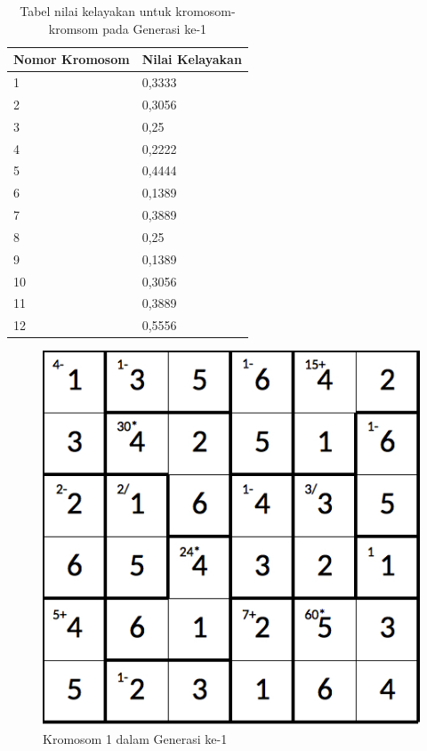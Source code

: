 \begin{table}
\centering
\captionsetup{justification=centering}
\caption[Tabel nilai kelayakan untuk kromosom-kromsom pada Generasi ke-1]{Tabel nilai kelayakan untuk kromosom-kromsom pada Generasi ke-1}
\begin{tabular}{| l | l |}
\hline
Nomor Kromosom & Nilai Kelayakan \\
\hline \hline
1 & 0,3333 \\
\hline
2 & 0,3056 \\
\hline
3 & 0,25 \\
\hline
4 & 0,2222 \\
\hline
5 & 0,4444 \\
\hline
6 & 0,1389 \\
\hline
7 & 0,3889 \\
\hline
8 & 0,25 \\
\hline
9 & 0,1389 \\
\hline
10 & 0,3056 \\
\hline
11 & 0,3889 \\
\hline
12 & 0,5556 \\
\hline
\end{tabular}
\label{tab:analisishg2}
\end{table}

\clearpage

\begin{figure}
\centering
\captionsetup{justification=centering}
\includegraphics[scale=0.333]{Gambar/hybridgenetic/Generation1Chromosome1}
\caption[Kromosom 1 dalam Generasi ke-1]{Kromosom 1 dalam Generasi ke-1}
\label{fig:analisisg1k1}
\end{figure}

